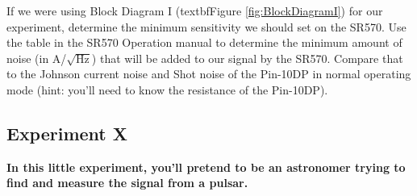 \documentclass{../lab}
\begin{document}
If we were using Block Diagram I (textbf{Figure \ref{fig:BlockDiagramI}}) for our experiment, determine the minimum sensitivity we should set on the SR570. Use the table in the SR570 Operation manual to determine the minimum amount of noise (in A/$\sqrt{\text{Hz}}$) that will be added to our signal by the SR570. Compare that to the Johnson current noise and Shot noise of the Pin-10DP in normal operating mode (hint: you'll need to know the resistance of the Pin-10DP).

\subsection{Experiment X}

\textbf{In this little experiment, you'll pretend to be an astronomer trying to find and measure the signal from a pulsar.}
\end{document}
